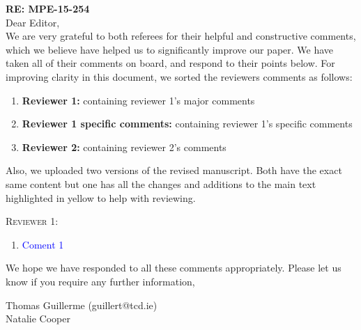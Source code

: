 \documentclass[12pt,letterpaper]{article}
\renewcommand{\section}[1]{%
\bigskip
\begin{center}
\begin{Large}
\normalfont\scshape #1
\medskip
\end{Large}
\end{center}}
\begin{document}
\textbf{RE: MPE-15-254}\\
\bigskip
Dear Editor,\\ %
\bigskip
We are very grateful to both referees for their helpful and constructive comments, which we believe have helped us to significantly improve our paper. We have taken all of their comments on board, and respond to their points below. For improving clarity in this document, we sorted the reviewers comments as follows:
\begin{enumerate}
\item \textbf{Reviewer 1:} containing reviewer 1's major comments
\item \textbf{Reviewer 1 specific comments:} containing reviewer 1's specific comments
\item \textbf{Reviewer 2:} containing reviewer 2's comments
\end{enumerate}
Also, we uploaded two versions of the revised manuscript. Both have the exact same content but one has all the changes and additions to the main text highlighted in yellow to help with reviewing.

\section{Reviewer 1:}

\begin{enumerate}
\item{\textcolor{blue}{Coment 1}}

\end{enumerate}

We hope we have responded to all these comments appropriately. Please let us know if you require any further information,\\
\bigskip

Thomas Guillerme (guillert@tcd.ie)\\
Natalie Cooper
\end{document}
